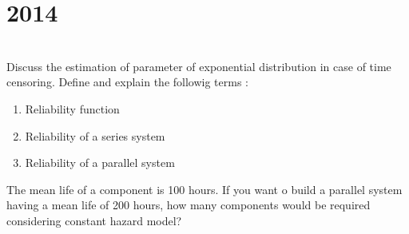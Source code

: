 \section*{2014}
\vspace{-.5cm}
\hrulefill \smallskip\\
 Discuss the estimation of parameter of exponential distribution in case of time censoring.
\myline
{} Define and explain the followig terms :
\begin{enumerate}[topsep=0pt, itemsep = -2pt,label=(\roman*)]
\item Reliability function
\item Reliability of a series system
\item Reliability of a parallel system
\end{enumerate}
The mean life of a component is 100 hours. If you want o build a parallel system having a mean life of 200 hours, how many components would be required considering constant hazard model?